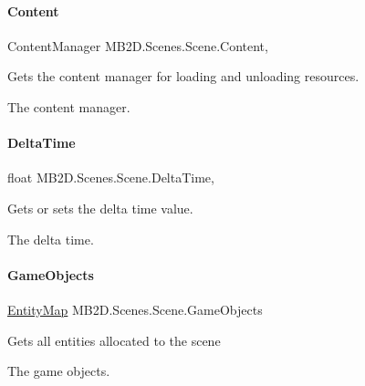 \paragraph{\texorpdfstring{Content}{Content}}
{\footnotesize\ttfamily Content\+Manager M\+B2\+D.\+Scenes.\+Scene.\+Content\hspace{0.3cm}{\ttfamily [get]}, {\ttfamily [protected]}}



Gets the content manager for loading and unloading resources. 

The content manager.\hypertarget{class_m_b2_d_1_1_scenes_1_1_scene_a43b51703cf436d8033fac12386b300ba}{}\label{class_m_b2_d_1_1_scenes_1_1_scene_a43b51703cf436d8033fac12386b300ba} 
\paragraph{\texorpdfstring{Delta\+Time}{DeltaTime}}
{\footnotesize\ttfamily float M\+B2\+D.\+Scenes.\+Scene.\+Delta\+Time\hspace{0.3cm}{\ttfamily [get]}, {\ttfamily [set]}}



Gets or sets the delta time value. 

The delta time.\hypertarget{class_m_b2_d_1_1_scenes_1_1_scene_aae9f1aa11591fa124e5da41f53138ea1}{}\label{class_m_b2_d_1_1_scenes_1_1_scene_aae9f1aa11591fa124e5da41f53138ea1} 
\paragraph{\texorpdfstring{Game\+Objects}{GameObjects}}
{\footnotesize\ttfamily \hyperlink{class_m_b2_d_1_1_entity_component_1_1_entity_map}{Entity\+Map} M\+B2\+D.\+Scenes.\+Scene.\+Game\+Objects\hspace{0.3cm}{\ttfamily [get]}}



Gets all entities allocated to the scene 

The game objects.\hypertarget{class_m_b2_d_1_1_scenes_1_1_scene_ac683a1684a15a3da44197188e13d2c2a}{}\label{class_m_b2_d_1_1_scenes_1_1_scene_ac683a1684a15a3da44197188e13d2c2a} 
